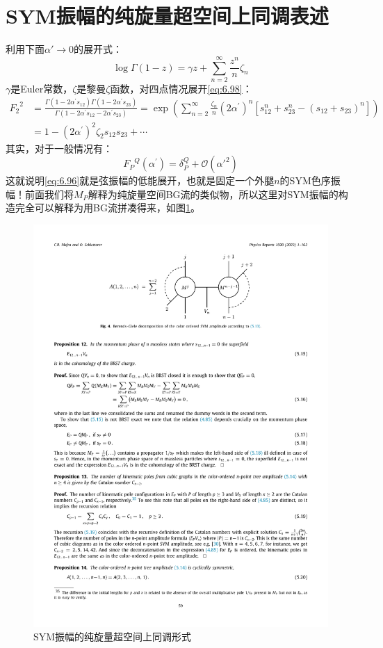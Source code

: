 \section{SYM振幅的纯旋量超空间上同调表述}
利用下面$\alpha'\to 0$的展开式：
\begin{equation}
	\log\Gamma(1-z)=\gamma z+\sum_{n=2}^\infty\frac{z^n}{n}\zeta_n
\end{equation}
$\gamma$是Euler常数，$\zeta$是黎曼$\zeta$函数，对四点情况展开\ref{eq:6.98}：
\begin{equation}
\begin{aligned}
		{F_2}^2&=\frac{\Gamma(1-2\alpha^{\prime}s_{12})\Gamma(1-2\alpha^{\prime}s_{23})}{\Gamma(1-2\alpha^{\prime}s_{12}-2\alpha^{\prime}s_{23})}=\exp\left(\sum_{n=2}^\infty\frac{\zeta_n}{n}(2\alpha^{\prime})^n\left[s_{12}^n+s_{23}^n-(s_{12}+s_{23})^n\right]\right)\\
	&=1-(2\alpha^{\prime})^2\zeta_2s_{12}s_{23}+\cdots
\end{aligned}
\end{equation}
其实，对于一般情况有：
\begin{equation}
	{F_P}^{Q}(\alpha^{\prime})=\delta_P^{Q}+\mathcal{O}({\alpha'}^2)
\end{equation}
这就说明\ref{eq:6.96}就是弦振幅的低能展开，也就是固定一个外腿$n$的SYM色序振幅！前面我们将$M_P$解释为纯旋量空间BG流的类似物，所以这里对SYM振幅的构造完全可以解释为用BG流拼凑得来，如图\ref{fig:6.9}。
\begin{figure}[htbp]
	\centering
	\includegraphics[width=0.8\linewidth]{figs/fig16.pdf}
	\caption{SYM振幅的纯旋量超空间上同调形式}
	\label{fig:6.9}
\end{figure}
